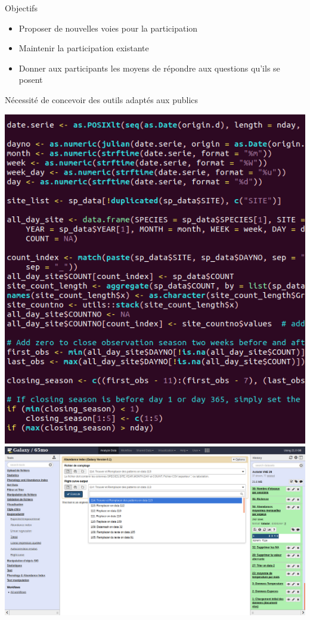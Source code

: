 \documentclass[ignorenonframetext,]{beamer}
\providecommand{\tightlist}{%
  \setlength{\itemsep}{0pt}\setlength{\parskip}{0pt}}
\begin{document}
\begin{frame}{Objectifs}

\begin{itemize}
\tightlist
\item
  Proposer de nouvelles voies pour la participation
\item
  Maintenir la participation existante
\item
  Donner aux participants les moyens de répondre aux questions qu'ils se
  posent
\end{itemize}

\end{frame}

\begin{frame}{Nécessité de concevoir des outils adaptés aux publics}

\includegraphics{figures/code_R.png}
\includegraphics{figures/outil_galaxy.png}

\end{frame}
\end{document}

